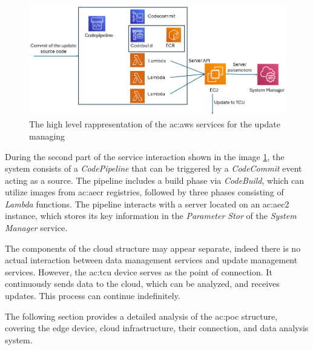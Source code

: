 \begin{figure}[h]  %
    \centering
    \includegraphics[width=1\textwidth]{images/AWS_update_services.png}  %
    \caption{The high level rappresentation of the \gls{ac:aws} services for the update managing}
    \label{fig:AWSUpdateServices}
\end{figure}
During the second part of the service interaction shown in the image \ref{fig:AWSUpdateServices}, the system consists of a \textit{CodePipeline} that can be triggered by a \textit{CodeCommit} event acting as a source. The pipeline includes a build phase via \textit{CodeBuild}, which can utilize images from \gls{ac:aecr} registries, followed by three phases consisting of \textit{Lambda} functions. The pipeline interacts with a server located on an \gls{ac:aec2} instance, which stores its key information in the \textit{Parameter Stor} of the \textit{System Manager} service.

The components of the cloud structure may appear separate, indeed there is no actual interaction between data management services and update management services. However, the \gls{ac:tcu} device serves as the point of connection. It continuously sends data to the cloud, which can be analyzed, and receives updates. This process can continue indefinitely.

The following section provides a detailed analysis of the \gls{ac:poc} structure, covering the edge device, cloud infrastructure, their connection, and data analysis system.
